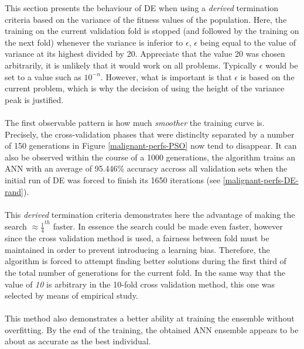 \documentclass[a4paper,12pt, oneside]{memoir}
\begin{document}
This section presents the behaviour of DE when using a \textit{derived} termination criteria based on the variance of the fitness values of the population. Here, the training on the current validation fold is stopped (and followed by the training on the next fold) whenever the variance is inferior to $\epsilon$, $\epsilon$ being equal to the value of variance at its highest divided by 20. Appreciate that the value 20 was chosen arbitrarily, it is unlikely that it would work on all problems. Typically $\epsilon$ would be set to a value such as $10^{-n}$. However, what is important is that $\epsilon$ is based on the current problem, which is why the decision of using the height of the variance peak is justified.
\\ \\
The first observable pattern is how much \textit{smoother} the training curve is. Precisely, the cross-validation phases that were distinclty separated by a number of 150 generations in Figure \ref{malignant-perfs-PSO} now tend to disappear. It can also be observed within the course of a 1000 generations, the algorithm trains an ANN with an average of 95.446\% accuracy accross all validation sets when the initial run of DE was forced to finish its 1650 iterations (see \ref{malignant-perfs-DE-rand}).
\\ \\
This \textit{derived} termination criteria demonstrates here the advantage of making the search $\approx \frac{1}{4}^{th}$ faster. In essence the search could be made even faster, however since the cross validation method is used, a fairness between fold must be maintained in order to prevent introducing a learning bias. Therefore, the algorithm is forced to attempt finding better solutions during the first third of the total number of generations for the current fold. In the same way that the value of \textit{10} is arbitrary in the 10-fold cross validation method, this one was selected by means of empirical study. 
\\ \\
This method also demonstrates a better ability at training the ensemble without overfitting. By the end of the training, the obtained ANN ensemble appears to be about as accurate as the best individual.
\end{document}

